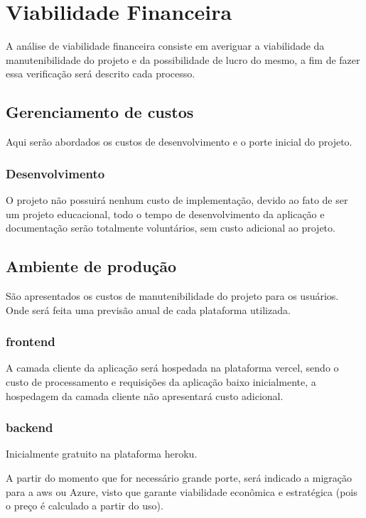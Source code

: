 \section{Viabilidade Financeira}
A análise de viabilidade financeira consiste em averiguar a viabilidade da manutenibilidade do projeto
e da possibilidade de lucro do mesmo, a fim de fazer essa verificação será descrito cada processo.

\subsection{Gerenciamento de custos}
Aqui serão abordados os custos de desenvolvimento e o porte inicial do projeto.

\subsubsection{Desenvolvimento}
O projeto não possuirá nenhum custo de implementação, devido ao fato de ser um projeto educacional,
todo o tempo de desenvolvimento da aplicação e documentação serão totalmente voluntários, sem custo adicional ao projeto.

\subsection{Ambiente de produção}
São apresentados os custos de manutenibilidade do projeto para os usuários. 
Onde será feita uma previsão anual de cada plataforma utilizada.

\subsubsection{\Gls{frontend}}
A camada cliente da aplicação será hospedada na plataforma \gls{vercel}, sendo o custo de processamento e requisições da aplicação
baixo inicialmente, a hospedagem da camada cliente não apresentará custo adicional.

\subsubsection{\Gls{backend}}
Inicialmente gratuito na plataforma \gls{heroku}.

A partir do momento que for necessário grande porte, será indicado a migração para a \gls{aws} ou Azure,
visto que garante viabilidade econômica e estratégica (pois o
preço é calculado a partir do uso).

